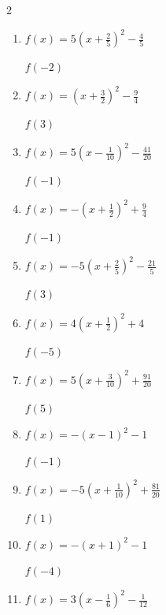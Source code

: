 \begin{multicols}{2}
\begin{enumerate}
$f(-5)$
        \phantom{$=-148$}

  \item $\displaystyle f(x)=5\left( x+\frac{2}{5}\right)^{2}-\frac{4}{5}$

$f(-2)$
        \phantom{$=12$}

\columnbreak %

  \item $\displaystyle f(x)=\left( x+\frac{3}{2}\right)^{2}-\frac{9}{4}$

$f(3)$
        \phantom{$=18$}

  \item $\displaystyle f(x)=5\left( x-\frac{1}{10}\right)^{2}-\frac{41}{20}$

$f(-1)$
        \phantom{$=4$}

  \item $\displaystyle f(x)=-\left( x+\frac{1}{2}\right)^{2}+\frac{9}{4}$

$f(-1)$
        \phantom{$=2$}

  \item $\displaystyle f(x)=-5\left( x+\frac{2}{5}\right)^{2}-\frac{21}{5}$

$f(3)$
        \phantom{$=-62$}

  \item $\displaystyle f(x)=4\left( x+\frac{1}{2}\right)^{2}+4$

$f(-5)$
        \phantom{$=85$}

\columnbreak %

\resetques

  \item $\displaystyle f(x)=5\left( x+\frac{3}{10}\right)^{2}+\frac{91}{20}$

$f(5)$
        \phantom{$=145$}

  \item $\displaystyle f(x)=-\left( x-1\right)^{2}-1$

$f(-1)$
        \phantom{$=-5$}

  \item $\displaystyle f(x)=-5\left( x+\frac{1}{10}\right)^{2}+\frac{81}{20}$

$f(1)$
        \phantom{$=-2$}

  \item $\displaystyle f(x)=-\left( x+1\right)^{2}-1$

$f(-4)$
        \phantom{$=-10$}

  \item $\displaystyle f(x)=3\left( x-\frac{1}{6}\right)^{2}-\frac{1}{12}$


\end{enumerate}
\end{multicols}
